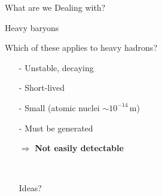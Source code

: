 \begin{frame}{What are we Dealing with?}
\begin{minipage}[t]{0.39\textwidth}
\begin{tikzpicture}[yscale = 1.2,xscale=0.6]
    \end{tikzpicture}
Heavy baryons
           \end{minipage}
            \begin{minipage}[t]{0.59\textwidth}
Which of these applies to heavy hadrons? %
\begin{center}
        \begin{itemize}
            \item[-] Unstable, decaying
            \item[-] Short-lived
            \item[-] Small {\small(atomic nuclei $\sim 10^{-14}\,$m})
            \item[-] Must be generated
            \item [$\Rightarrow$] \textbf{Not easily detectable}
            \\\item [\,] %
            \item [\ding{43}] Ideas?
        \end{itemize}
        \end{center}
      \end{minipage}
    \end{frame}
    \subsection{}


